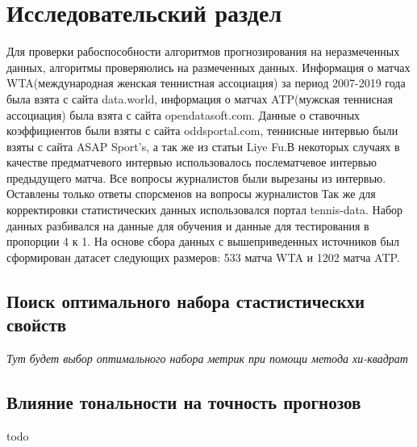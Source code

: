 \chapter{Исследовательский раздел}
Для проверки рабоспособности алгоритмов прогнозирования на неразмеченных данных, алгоритмы проверяюлись на размеченных данных.
Информация о матчах WTA(международная женская теннистная ассоциация) за период 2007-2019 года была взята с сайта data.world\cite{Book34}, информация о матчах ATP(мужская теннисная ассоциация) была взята с сайта opendatasoft.com\cite{Book35}.
Данные о ставочных коэффициентов были взяты с сайта oddsportal.com\cite{Book36}, теннисные интервью были взяты с сайта  ASAP
Sport’s\cite{Book37}, а так же из статьи Liye Fu\cite{Book38}.В некоторых случаях в качестве предматчевого интервью использовалось послематчевое интервью предыдущего матча. Все вопросы журналистов были вырезаны из интервью. Оставлены только ответы спорсменов на вопросы журналистов Так же для корректировки статистических данных использовался портал tennis-data\cite{Book39}. Набор данных разбивался на данные для обучения и данные для тестирования в пропорции 4 к 1.
На основе сбора данных с вышеприведенных источников был сформирован датасет следующих размеров: 533 матча WTA и 1202 матча ATP.
\section{Поиск оптимального набора стастистическхи свойств}
\textit{Тут будет выбор оптимального набора метрик при помощи метода хи-квадрат}
\section{Влияние тональности на точность прогнозов}
todo
